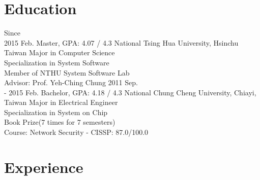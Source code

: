 \documentclass[]{friggeri-cv}
\begin{document}
\section{Education}

\begin{entrylist}
  \entry
    {Since \\
	 2015 Feb.}
    {Master, GPA: 4.07 / 4.3}
    {National Tsing Hua University, Hsinchu Taiwan}
	{Major in Computer Science \\
	Specialization in System Software \\
	Member of NTHU System Software Lab \\
	Advisor: Prof. Yeh-Ching Chung}
  \entry
    {2011 Sep. \\
	- 2015 Feb.}
    {Bachelor, GPA: 4.18 / 4.3}
    {National Chung Cheng University, Chiayi, Taiwan}
	{Major in Electrical Engineer \\
	Specialization in System on Chip \\
	Book Prize(7 times for 7 semesters) \\
	Course: Network Security - CISSP: 87.0/100.0}
\end{entrylist}

\section{Experience}
\end{document}
